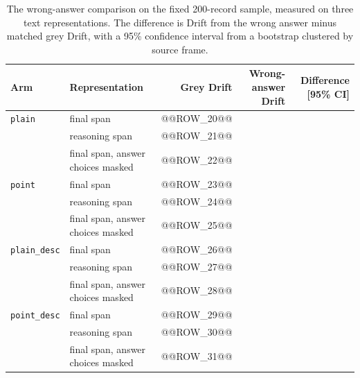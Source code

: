 \begin{table}[ht]
\centering
\caption[Wrong-answer comparison by text unit]{The wrong-answer comparison on the fixed 200-record sample, measured on three text representations. The difference is Drift from the wrong answer minus matched grey Drift, with a 95\% confidence interval from a bootstrap clustered by source frame.}
\label{tab:app-rq2-echo-unit}
\begin{tabular}{llrrr}
\toprule
Arm & Representation & Grey Drift & Wrong-answer Drift & Difference [95\% CI] \\
\midrule
\texttt{plain} & final span & @@ROW_20@@ \\
 & reasoning span & @@ROW_21@@ \\
 & final span, answer choices masked & @@ROW_22@@ \\
\texttt{point} & final span & @@ROW_23@@ \\
 & reasoning span & @@ROW_24@@ \\
 & final span, answer choices masked & @@ROW_25@@ \\
\texttt{plain\_desc} & final span & @@ROW_26@@ \\
 & reasoning span & @@ROW_27@@ \\
 & final span, answer choices masked & @@ROW_28@@ \\
\texttt{point\_desc} & final span & @@ROW_29@@ \\
 & reasoning span & @@ROW_30@@ \\
 & final span, answer choices masked & @@ROW_31@@ \\
\bottomrule
\end{tabular}
\end{table}
